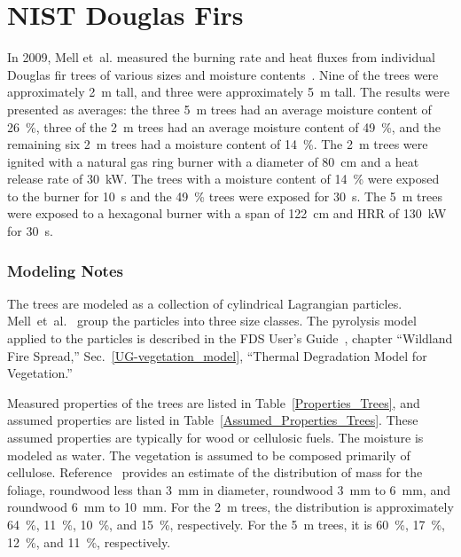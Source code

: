 \FloatBarrier

\section{NIST Douglas Firs}
\label{NIST_Douglas_Firs_Description}

In 2009, Mell et~al. measured the burning rate and heat fluxes from individual Douglas fir trees of various sizes and moisture contents~\cite{Mell:2009}. Nine of the trees were approximately 2~m tall, and three were approximately 5~m tall. The results were presented as averages: the three 5~m trees had an average moisture content of 26~\%, three of the 2~m trees had an average moisture content of 49~\%, and the remaining six 2~m trees had a moisture content of 14~\%. The 2~m trees were ignited with a natural gas ring burner with a diameter of 80~cm and a heat release rate of 30~kW. The trees with a moisture content of 14~\% were exposed to the burner for 10~s and the 49~\% trees were exposed for 30~s. The 5~m trees were exposed to a hexagonal burner with a span of 122~cm and HRR of 130~kW for 30~s.

\subsubsection{Modeling Notes}

The trees are modeled as a collection of cylindrical Lagrangian particles. Mell~et~al.~\cite{Mell:2009} group the particles into three size classes. The pyrolysis model applied to the particles is described in the FDS User's Guide~\cite{FDS_Users_Guide}, chapter ``Wildland Fire Spread,'' Sec.~\ref{UG-vegetation_model}, ``Thermal Degradation Model for Vegetation.''

Measured properties of the trees are listed in Table~\ref{Properties_Trees}, and assumed properties are listed in Table~\ref{Assumed_Properties_Trees}. These assumed properties are typically for wood or cellulosic fuels. The moisture is modeled as water. The vegetation is assumed to be composed primarily of cellulose. Reference~\cite{Mell:2009} provides an estimate of the distribution of mass for the foliage, roundwood less than 3~mm in diameter, roundwood 3~mm to 6~mm, and roundwood 6~mm to 10~mm. For the 2~m trees, the distribution is approximately 64~\%, 11~\%, 10~\%, and 15~\%, respectively. For the 5~m trees, it is 60~\%, 17~\%, 12~\%, and 11~\%, respectively.

